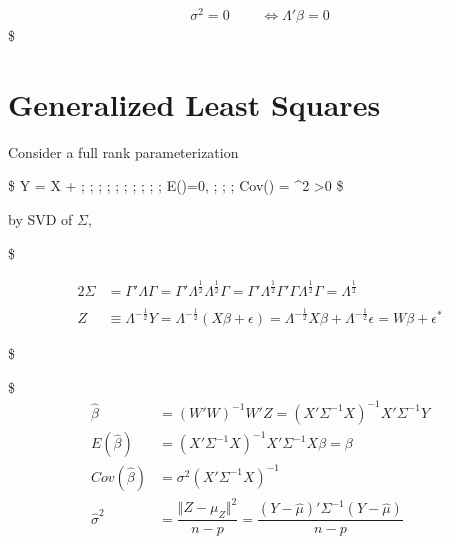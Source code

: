 \documentclass[
]{book}
\begin{document}
{{{\begin{align}
\\
\\

\sigma^2 = 0 \; \; \; \; \; &\iff \Lambda ' \beta = 0 \tag{2}


\end{align}
\$

\hypertarget{generalized-least-squares}{%
\section{Generalized Least Squares}\label{generalized-least-squares}}

Consider a full rank parameterization

\$
Y = X \beta + \epsilon ; ; ; ; ; ; ; ; ; ; E(\epsilon)=0, ; ; ; Cov(\epsilon) = \sigma\^{}2 \Sigma\textgreater0
\$

by SVD of \(\Sigma\),

\$

\begin{alignat}{2}


\Sigma

&= \Gamma ' \Lambda \Gamma
= \Gamma ' \Lambda^{\tfrac{1}{2}} \Lambda^{\tfrac{1}{2}}\Gamma
= \Gamma ' \Lambda^{\tfrac{1}{2}} \Gamma' \Gamma \Lambda^{\tfrac{1}{2}}\Gamma
= \Lambda^{\tfrac{1}{2}} 

\\

\\

Z &\equiv \Lambda^{-\tfrac{1}{2}} Y = \Lambda^{-\tfrac{1}{2}}(X \beta + \epsilon) = \Lambda^{-\tfrac{1}{2}}X \beta + \Lambda^{-\tfrac{1}{2}} \epsilon = W \beta + \epsilon^\ast

\end{alignat}

\$

\$
\begin{align}

\hat \beta &= (W'W)^{-1} W' Z = (X' \Sigma^{-1}X)^{-1}X'\Sigma^{-1}Y

\\

E(\hat \beta) &= (X' \Sigma^{-1}X)^{-1} X'\Sigma^{-1} X \beta = \beta

\\

Cov(\hat \beta) &= \sigma^2 (X' \Sigma^{-1}X)^{-1}

\\

\hat \sigma^2 &= \dfrac{\Vert Z - \mu_Z \Vert^2}{n-p} = \dfrac{(Y-\hat \mu)' \Sigma^{-1} (Y-\hat \mu)}{n-p}


\end{align}}}}
\end{document}
